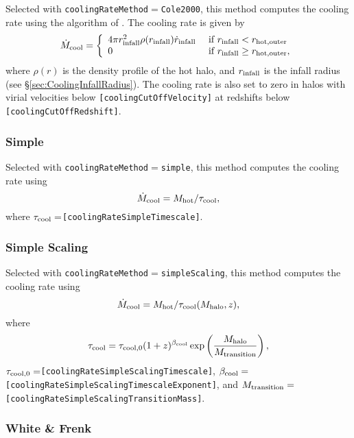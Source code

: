 Selected with {\tt coolingRateMethod}$=${\tt Cole2000}, this method computes the cooling rate using the algorithm of \cite{cole_hierarchical_2000}. The cooling rate is given by
\begin{equation}
\dot{M}_{\rm cool} = \left\{ \begin{array}{ll} 4 \pi r_{\rm infall}^2 \rho(r_{\rm infall}) \dot{r}_{\rm infall} & \hbox{ if } r_{\rm infall} < r_{\rm hot, outer} \\ 0 & \hbox{ if } r_{\rm infall} \ge r_{\rm hot, outer}, \end{array} \right.
\end{equation}
where $\rho(r)$ is the density profile of the hot halo, and $r_{\rm infall}$ is the infall radius (see \S\ref{sec:CoolingInfallRadius}). The cooling rate is also set to zero in halos with virial velocities below {\tt [coolingCutOffVelocity]} at redshifts below {\tt [coolingCutOffRedshift]}.

\subsubsection{Simple}

Selected with {\tt coolingRateMethod}$=${\tt simple}, this method computes the cooling rate using
\begin{equation}
\dot{M}_{\rm cool} = M_{\rm hot}/\tau_{\rm cool} ,
\end{equation}
where $\tau_{\rm cool}=${\tt [coolingRateSimpleTimescale]}.

\subsubsection{Simple Scaling}

Selected with {\tt coolingRateMethod}$=${\tt simpleScaling}, this method computes the cooling rate using
\begin{equation}
\dot{M}_{\rm cool} = M_{\rm hot}/\tau_{\rm cool}(M_{\rm halo},z) ,
\end{equation}
where 
\begin{equation}
\tau_{\rm cool}=\tau_{\rm cool,0} (1+z)^{\beta_{\rm cool}} \exp \left({M_{\rm halo} \over M_{\rm transition}}\right),
\end{equation}
$\tau_{\rm cool,0}=${\tt [coolingRateSimpleScalingTimescale]}, $\beta_{\rm cool}=${\tt [coolingRateSimpleScalingTimescaleExponent]}, and $M_{\rm transition}=${\tt [coolingRateSimpleScalingTransitionMass]}.

\subsubsection{White \& Frenk}

